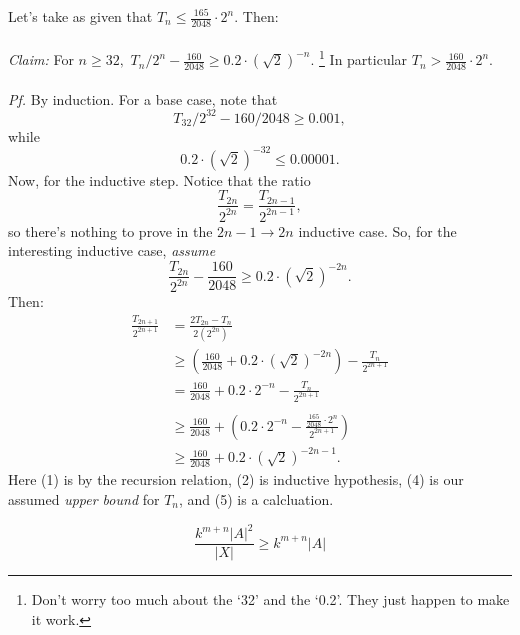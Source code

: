 \documentclass{amsart}
\begin{document}
Let's take as given that $T_n \leq \frac{165}{2048} \cdot 2^n.$
Then: \\ \\
\textit{Claim:} For $n \geq 32,$ $T_n/2^n - \frac{160}{2048} \geq 0.2 \cdot (\sqrt{2})^{-n}.$ \footnote{Don't worry too much about the `32' and the `0.2'. They just happen to make it work.} In particular $T_n > \frac{160}{2048} \cdot 2^n.$ \\ \\
\textit{Pf.} By induction. For a base case, note that $$T_{32}/2^{32} - 160/2048 \geq 0.001,$$ while $$0.2\cdot (\sqrt{2})^{-32} \leq 0.00001.$$
Now, for the inductive step. Notice that the ratio $$\frac{T_{2n}}{2^{2n}} = \frac{T_{2n-1}}{2^{2n-1}},$$ so there's nothing to prove in the $2n-1 \to 2n$ inductive case.
So, for the interesting inductive case, \emph{assume} $$\frac{T_{2n}}{2^{2n}} - \frac{160}{2048} \geq 0.2 \cdot (\sqrt{2})^{-2n}.$$
Then:
\begin{align}
\frac{T_{2n+1}}{2^{2n+1}} &= \frac{2 T_{2n}-T_n}{2(2^{2n})} \\
&\geq \left(\frac{160}{2048} + 0.2\cdot  (\sqrt{2})^{-2n} \right) - \frac{T_n}{2^{2n+1}} \\
&= \frac{160}{2048} + 0.2 \cdot 2^{-n} - \frac{T_n}{2^{2n+1}} \\
& \nonumber \\
&\geq \frac{160}{2048} + \left(0.2 \cdot 2^{-n} - \frac{\frac{165}{2048}\cdot 2^n}{2^{2n+1}} \right) \\
&\geq \frac{160}{2048} + 0.2 \cdot (\sqrt{2})^{-2n-1}.
\end{align}
Here (1) is by the recursion relation, (2) is inductive hypothesis, (4) is our assumed \emph{upper bound} for $T_n$, and (5) is a calcluation.


$$\frac{k^{m+n}|A|^2}{|X|} \geq k^{m+n}|A|$$
\end{document}
